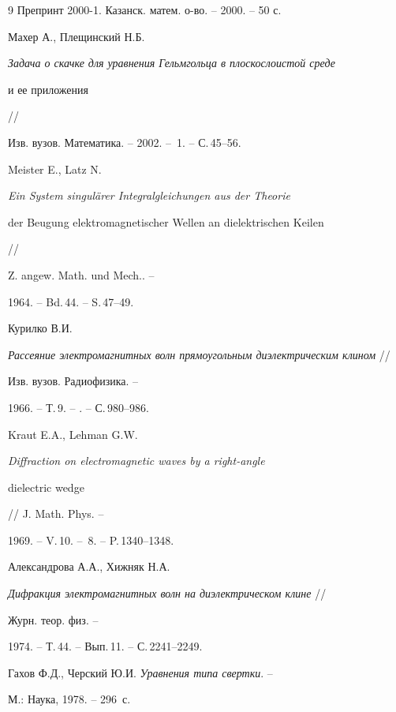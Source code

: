 \begin{thebibliography}{9}
Препринт \mbox{2000-1}. Казанск. матем. о-во. -- 2000. -- 50 с.







Махер А., Плещинский Н.Б.


{\em Задача о скачке для уравнения Гельмгольца в плоскослоистой среде


и ее приложения} //


Изв. вузов. Математика. -- 2002. -- \No\,1. -- С.\,45--56.







Meister E., Latz N.


{\em Ein System singul\"arer Integralgleichungen aus der Theorie


der Beugung elektro\-magnetischer Wellen an dielektrischen Keilen} //


Z. angew. Math. und Mech.. --


1964. -- Bd.\,44. -- S.\,47--49.







Курилко В.И.


{\em Рассеяние электромагнитных волн прямоугольным диэлектрическим клином} //


Изв. вузов. Радиофизика. --


1966. -- Т.\,9. -- . -- С.\,980--986.







Kraut E.A., Lehman G.W.


{\em Diffraction on electromagnetic waves by a right-angle


dielectric wedge} // J. Math. Phys. --


1969. -- V.\,10. -- \No\,8. -- P.\,1340--1348.







Александрова А.А., Хижняк Н.А.


{\em Дифракция электромагнитных волн на диэлектрическом клине} //


Журн. теор. физ. --


1974. -- Т.\,44. -- Вып.\,11. -- С.\,2241--2249.







Гахов Ф.Д., Черский Ю.И. {\em Уравнения типа свертки}. --


М.: Наука, 1978. -- 296~с.





\end{thebibliography}





